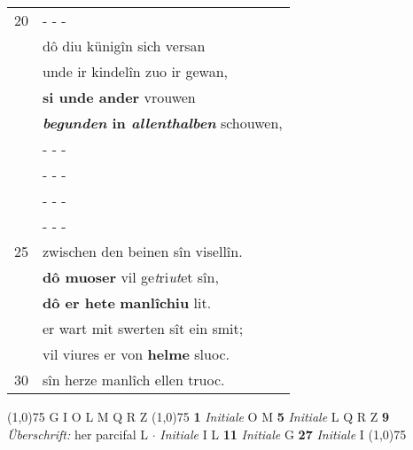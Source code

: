 \documentclass[8pt,a4paper,notitlepage]{article}
\begin{document}
\begin{table}[ht]
\begin{minipage}[t]{0.5\linewidth}
\begin{tabular}{rl}
20 & \multicolumn{1}{l}{ - - - }\\ 
 & dô diu künigîn sich versan\\ 
 & unde ir kindelîn zuo ir gewan,\\ 
 & \textbf{si unde ander} vrouwen\\ 
 & \textbf{\textit{begunden} in \textit{allenthalben}} schouwen,\\ 
 & \multicolumn{1}{l}{ - - - }\\ 
 & \multicolumn{1}{l}{ - - - }\\ 
 & \multicolumn{1}{l}{ - - - }\\ 
 & \multicolumn{1}{l}{ - - - }\\ 
25 & zwischen den beinen sîn visellîn.\\ 
 & \textbf{dô muoser} vil ge\textit{t}ri\textit{ut}et sîn,\\ 
 & \textbf{dô er hete} \textbf{manlîchiu} lit.\\ 
 & er wart mit swerten sît ein smit;\\ 
 & vil viures er von \textbf{helme} sluoc.\\ 
30 & sîn herze manlîch ellen truoc.\\ 
\end{tabular}
\scriptsize
\line(1,0){75} \newline
G I O L M Q R Z \newline
\line(1,0){75} \newline
\textbf{1} \textit{Initiale} O M  \textbf{5} \textit{Initiale} L Q R Z  \textbf{9} \textit{Überschrift:} her parcifal L   $\cdot$ \textit{Initiale} I L  \textbf{11} \textit{Initiale} G  \textbf{27} \textit{Initiale} I  \newline
\line(1,0){75} \newline

\end{minipage}
\end{table}
\end{document}
